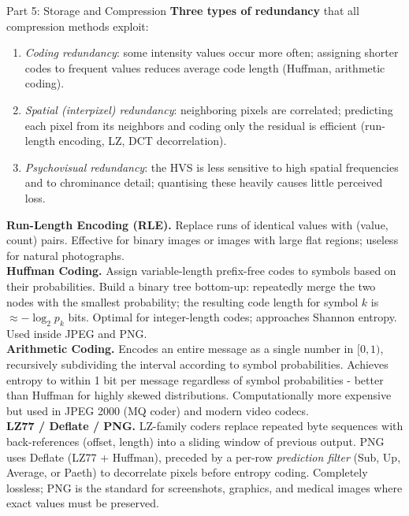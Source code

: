 \documentclass[letterpaper]{article}
\begin{document}
\begin{notes}{Part 5: Storage and Compression}
\textbf{Three types of redundancy} that all compression methods exploit:
\begin{enumerate}
    \item \emph{Coding redundancy}: some intensity values occur more often; assigning shorter codes to frequent values reduces average code length (Huffman, arithmetic coding).
    \item \emph{Spatial (interpixel) redundancy}: neighboring pixels are correlated; predicting each pixel from its neighbors and coding only the residual is efficient (run-length encoding, LZ, DCT decorrelation).
    \item \emph{Psychovisual redundancy}: the HVS is less sensitive to high spatial frequencies and to chrominance detail; quantising these heavily causes little perceived loss.
\end{enumerate}


\textbf{Run-Length Encoding (RLE).} Replace runs of identical values with (value, count) pairs. Effective for binary images or images with large flat regions; useless for natural photographs.\\

\textbf{Huffman Coding.} Assign variable-length prefix-free codes to symbols based on their probabilities. Build a binary tree bottom-up: repeatedly merge the two nodes with the smallest probability; the resulting code length for symbol $k$ is $\approx -\log_2 p_k$ bits. Optimal for integer-length codes; approaches Shannon entropy. Used inside JPEG and PNG.\\

\textbf{Arithmetic Coding.} Encodes an entire message as a single number in $[0,1)$, recursively subdividing the interval according to symbol probabilities. Achieves entropy to within 1 bit per message regardless of symbol probabilities - better than Huffman for highly skewed distributions. Computationally more expensive but used in JPEG 2000 (MQ coder) and modern video codecs.\\

\textbf{LZ77 / Deflate / PNG.} LZ-family coders replace repeated byte sequences with back-references (offset, length) into a sliding window of previous output. PNG uses Deflate (LZ77 + Huffman), preceded by a per-row \emph{prediction filter} (Sub, Up, Average, or Paeth) to decorrelate pixels before entropy coding. Completely lossless; PNG is the standard for screenshots, graphics, and medical images where exact values must be preserved.


\end{notes}
\end{document}
